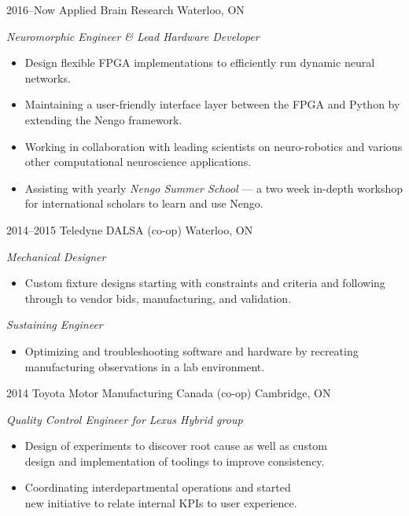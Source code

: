 \documentclass[a4paper,nocolors]{cv-friggeri-ben}
\begin{document}
\begin{entrylist}

\entry
    {2016--Now}
    {Applied Brain Research}
    {Waterloo, ON}
    {\emph{Neuromorphic Engineer \& Lead Hardware Developer}
    \begin{itemize}
        \item Design flexible FPGA implementations to efficiently run dynamic
            neural networks.
        \item Maintaining a user-friendly interface layer between the FPGA and
            Python by extending the Nengo framework.
        \item Working in collaboration with leading scientists on
            neuro-robotics and various other computational neuroscience
            applications.
        \item Assisting with yearly \emph{Nengo Summer School} --- a two week
            in-depth workshop for international scholars to learn and use Nengo.
    \end{itemize}}

\entry
    {2014--2015}
    {Teledyne DALSA {\normalfont (co-op)}}
    {Waterloo, ON}
    {\emph{Mechanical Designer}
    \begin{itemize}
        \item Custom fixture designs starting with constraints and criteria and
            following through to vendor bids, manufacturing, and validation.
    \end{itemize}
    \emph{Sustaining Engineer}
    \begin{itemize}
        \item Optimizing and troubleshooting software and hardware by recreating
            manufacturing observations in a lab environment.
    \end{itemize}}

\entry
    {2014}
    {Toyota Motor Manufacturing Canada {\normalfont (co-op)}}
    {Cambridge, ON}
    {\emph{Quality Control Engineer for Lexus Hybrid group}
    \begin{itemize}
        \item Design of experiments to discover root cause as well as custom\\
            design and implementation of toolings to improve consistency.
        \item Coordinating interdepartmental operations and started \\
            new initiative to relate internal KPIs to user experience.
    \end{itemize}}

\end{entrylist}  %
\end{document}
